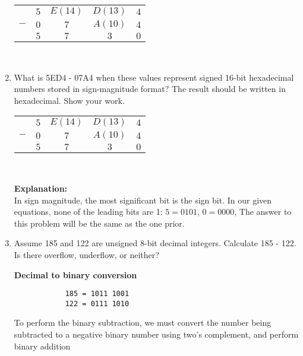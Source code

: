 \documentclass{article}
\begin{document}
\begin{enumerate}
        \begin{center}
            \begin{tabular}{c c c c c}
                    & $5$ & $E(14)$ & $D(13)$ & $4$\\
                $-$ & $0$ & $7$ & $A(10)$ & $4$\\
                \hline
                & $5$ & $7$ & $3$ & $0$\\
            \end{tabular}\\[0.25in]
        \end{center}

        \item What is 5ED4 - 07A4 when these values represent signed 16-bit hexadecimal numbers stored in sign-magnitude format? The result should be written in hexadecimal. Show your work.
        \begin{center}
            \begin{tabular}{c c c c c}
                    & $5$ & $E(14)$ & $D(13)$ & $4$\\
                $-$ & $0$ & $7$ & $A(10)$ & $4$\\
                \hline
                & $5$ & $7$ & $3$ & $0$\\
            \end{tabular}\\[0.25in]
        \end{center}

        \textbf{Explanation:}\\
        In sign magnitude, the most significant bit is the sign bit. In our given equations, none of the leading bits are 1: $5 = 0101$, $0 = 0000$, The answer to this problem will be the same as the one prior.

        \item Assume 185 and 122 are unsigned 8-bit decimal integers. Calculate 185 - 122. Is there overflow, underflow, or neither?
        
        \textbf{Decimal to binary conversion}
        \begin{verbatim}
            185 = 1011 1001
            122 = 0111 1010
        \end{verbatim}

        To perform the binary subtraction, we must convert the number being subtracted to a negative binary number using two's complement, and perform binary addition


\end{enumerate}
\end{document}
